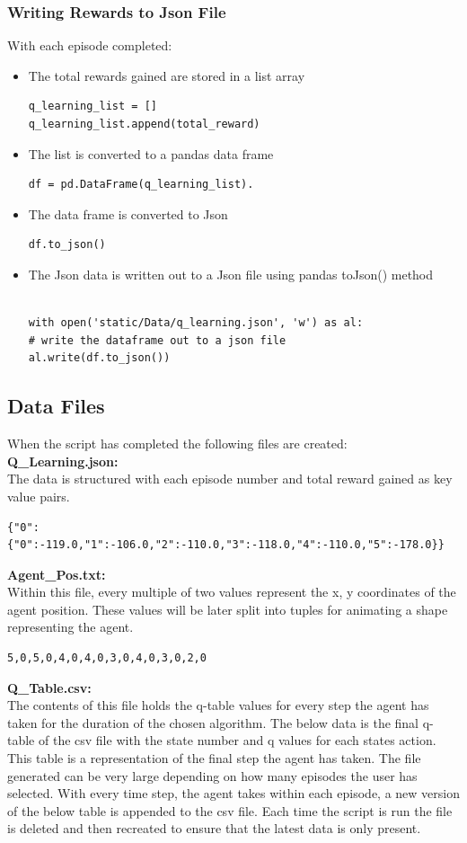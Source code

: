 \subsubsection{Writing Rewards to Json File}
With each episode completed: 
\begin{itemize}
	\item The total rewards gained are stored in a list array
\begin{verbatim}
q_learning_list = []
q_learning_list.append(total_reward)
\end{verbatim}

	\item The list is converted to a pandas data frame
\begin{verbatim}
df = pd.DataFrame(q_learning_list).
\end{verbatim}
	\item The data frame is converted to Json
\begin{verbatim}
df.to_json()
\end{verbatim}
	\item The Json data is written out to a Json file using pandas toJson() method
\begin{verbatim}

with open('static/Data/q_learning.json', 'w') as al:
# write the dataframe out to a json file
al.write(df.to_json())
\end{verbatim}
\end{itemize}
 
\subsection{Data Files}
When the script has completed the following files are created:\\
\textbf{Q\_Learning.json:}\\
The data is structured with each episode number and total reward gained as key value pairs.
\begin{verbatim}
{"0":{"0":-119.0,"1":-106.0,"2":-110.0,"3":-118.0,"4":-110.0,"5":-178.0}}
\end{verbatim}
\textbf{Agent\_Pos.txt:}\\
Within this file, every multiple of two values represent the x, y coordinates of the agent position.
These values will be later split into tuples for animating a shape representing the agent.
\begin{verbatim}
5,0,5,0,4,0,4,0,3,0,4,0,3,0,2,0
\end{verbatim}
\textbf{Q\_Table.csv:}\\
The contents of this file holds the q-table values for every step the agent has taken for the duration of the chosen algorithm. The below data is the final q-table of the csv file with the state number and q values for each states action. This table is a representation of the final step the agent has taken. The file generated can be very large depending on how many episodes the user has selected. With every time step, the agent takes within each episode, a new version of the below table is appended to the csv file. Each time the script is run the file is deleted and then recreated to ensure that the latest data is only present.


